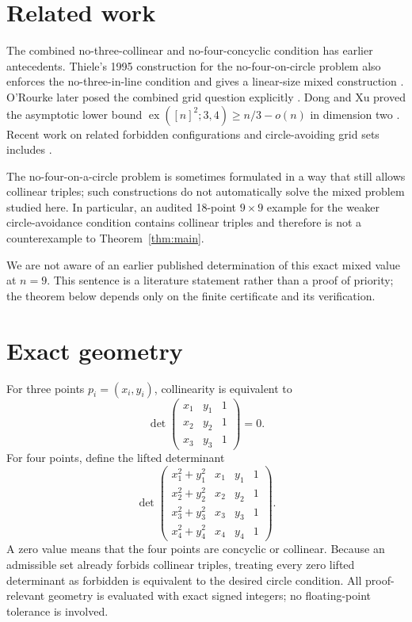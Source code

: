 \documentclass[11pt,a4paper]{article}
\theoremstyle{definition}
\theoremstyle{remark}
\begin{document}
\section{Related work}
The combined no-three-collinear and no-four-concyclic condition has earlier
antecedents. Thiele's 1995 construction for the no-four-on-circle problem also
enforces the no-three-in-line condition and gives a linear-size mixed
construction \cite{thiele1995}. O'Rourke later posed the combined grid question
explicitly \cite{orourke2018}. Dong and Xu proved the asymptotic lower bound
$\operatorname{ex}([n]^2;3,4)\ge n/3-o(n)$ in dimension two
\cite{dongxu2025}. Recent work on related forbidden configurations and
circle-avoiding grid sets includes \cite{janosik2026,ghosal2026,zhang2026}.

The no-four-on-a-circle problem is sometimes formulated in a way that still
allows collinear triples; such constructions do not automatically solve the
mixed problem studied here. In particular, an audited 18-point $9\times9$
example for the weaker circle-avoidance condition contains collinear triples
and therefore is not a counterexample to Theorem~\ref{thm:main}.

We are not aware of an earlier published determination of this exact mixed
value at $n=9$. This sentence is a literature statement rather than a proof of
priority; the theorem below depends only on the finite certificate and its
verification.

\section{Exact geometry}
For three points $p_i=(x_i,y_i)$, collinearity is equivalent to
\[
  \det\begin{pmatrix}
  x_1&y_1&1\\x_2&y_2&1\\x_3&y_3&1
  \end{pmatrix}=0.
\]
For four points, define the lifted determinant
\begin{equation}\label{eq:circle}
  \det\begin{pmatrix}
  x_1^2+y_1^2&x_1&y_1&1\\
  x_2^2+y_2^2&x_2&y_2&1\\
  x_3^2+y_3^2&x_3&y_3&1\\
  x_4^2+y_4^2&x_4&y_4&1
  \end{pmatrix}.
\end{equation}
A zero value means that the four points are concyclic or collinear. Because
an admissible set already forbids collinear triples, treating every zero
lifted determinant as forbidden is equivalent to the desired circle condition.
All proof-relevant geometry is evaluated with exact signed integers; no
floating-point tolerance is involved.
\end{document}
